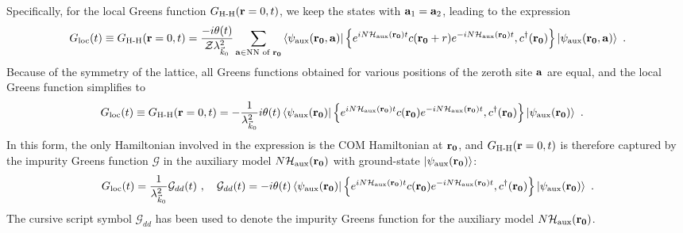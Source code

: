 \documentclass[reprint,hidelinks]{revtex4-2}
\begin{document}
Specifically, for the local Greens function \(G_\text{H-H}({\bf r}=0, t)\), we keep the states with \({\bf a}_1 = {\bf a}_2\), leading to the expression
\begin{equation}\begin{aligned}
	\label{greens_func_approx}
	G_\text{loc}(t) \equiv G_\text{H-H}({\bf r}=0, t) =  \frac{-i\theta(t)}{\mathcal{Z} \lambda_{\vec k_0}^2}\sum_{{\bf a} \in \text{NN of }{\bf r_0}}\braket{\psi_\text{aux}({\bf r_0}, {\bf a}) | \left\{ e^{i N \mathcal{H}_\text{aux}({\bf r_0}) t}c({\bf r_0} + r)e^{-i N \mathcal{H}_\text{aux}({\bf r_0}) t}, c^\dagger({\bf r_0}) \right\} | \psi_\text{aux}({\bf r_0}, {\bf a})}~.
\end{aligned}\end{equation}
Because of the symmetry of the lattice, all Greens functions obtained for various positions of the zeroth site \({\bf a}\) are equal, and the local Greens function simplifies to
\begin{equation}\begin{aligned}
	G_\text{loc}(t) \equiv G_\text{H-H}({\bf r}=0, t) &= -\frac{1}{\lambda_{\vec k_0}^2 }i\theta(t) \braket{\psi_\text{aux}({\bf r_0}) | \left\{ e^{i N \mathcal{H}_\text{aux}({\bf r_0}) t}c({\bf r_0})e^{-i N \mathcal{H}_\text{aux}({\bf r_0}) t}, c^\dagger({\bf r_0}) \right\} | \psi_\text{aux}({\bf r_0})}~.
\end{aligned}\end{equation}
In this form, the only Hamiltonian involved in the expression is the COM Hamiltonian at \({\bf r_0}\), and \(G_\text{H-H}({\bf r}=0, t)\) is therefore captured by the impurity Greens function \(\mathcal{G}\) in the auxiliary model \(N \mathcal{H}_\text{aux}({\bf r_0})\) with ground-state \(\ket{\psi_\text{aux}({\bf r_0})}\):
\begin{equation}\begin{aligned}
	\label{greens_func_relation}
	G_\text{loc}(t) = \frac{1}{\lambda_{\vec k_0}^2}\mathcal{G}_{dd}(t)~,\quad \mathcal{G}_{dd}(t) = -i\theta(t) \braket{\psi_\text{aux}({\bf r_0}) | \left\{ e^{i N \mathcal{H}_\text{aux}({\bf r_0}) t}c({\bf r_0})e^{-i N \mathcal{H}_\text{aux}({\bf r_0}) t}, c^\dagger({\bf r_0}) \right\} | \psi_\text{aux}({\bf r_0})}~.
\end{aligned}\end{equation}
The cursive script symbol \(\mathcal{G}_{dd}\) has been used to denote the impurity Greens function for the auxiliary model \(N \mathcal{H}_\text{aux}({\bf r_0})\).
\end{document}

